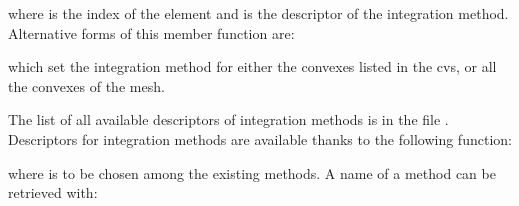 \documentclass[a4paper,11pt,english]{sphinxmanual}
\begin{document}
where  is the index of the element and  is the descriptor of the
integration method. Alternative forms of this member function are:

\begin{sphinxVerbatim}[commandchars=\\\{\}]
   
                                       
  
\end{sphinxVerbatim}

which set the integration method for either the convexes listed in the  cvs,
or all the convexes of the mesh.

The list of all available descriptors of integration methods is in the file
. Descriptors for integration methods are
available thanks to the following function:

\begin{sphinxVerbatim}[commandchars=\\\{\}]
   
\end{sphinxVerbatim}

where  is to be chosen among the existing methods. A name of a
method can be retrieved with:

\begin{sphinxVerbatim}[commandchars=\\\{\}]
   
\end{sphinxVerbatim}
\end{document}
